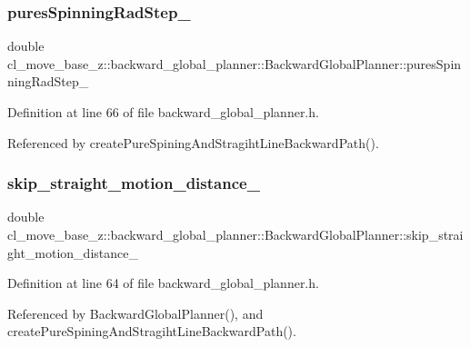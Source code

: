 \subsubsection{\texorpdfstring{pures\+Spinning\+Rad\+Step\+\_\+}{puresSpinningRadStep\_}}
{\footnotesize\ttfamily double cl\+\_\+move\+\_\+base\+\_\+z\+::backward\+\_\+global\+\_\+planner\+::\+Backward\+Global\+Planner\+::pures\+Spinning\+Rad\+Step\+\_\+\hspace{0.3cm}{\ttfamily [private]}}



Definition at line 66 of file backward\+\_\+global\+\_\+planner.\+h.



Referenced by create\+Pure\+Spining\+And\+Stragiht\+Line\+Backward\+Path().

\mbox{\label{classcl__move__base__z_1_1backward__global__planner_1_1BackwardGlobalPlanner_a045290b931b816b84ced2cfb6c39fcce}} 
\subsubsection{\texorpdfstring{skip\+\_\+straight\+\_\+motion\+\_\+distance\+\_\+}{skip\_straight\_motion\_distance\_}}
{\footnotesize\ttfamily double cl\+\_\+move\+\_\+base\+\_\+z\+::backward\+\_\+global\+\_\+planner\+::\+Backward\+Global\+Planner\+::skip\+\_\+straight\+\_\+motion\+\_\+distance\+\_\+\hspace{0.3cm}{\ttfamily [private]}}



Definition at line 64 of file backward\+\_\+global\+\_\+planner.\+h.



Referenced by Backward\+Global\+Planner(), and create\+Pure\+Spining\+And\+Stragiht\+Line\+Backward\+Path().




